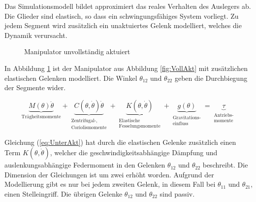 Das Simulationsmodell bildet approximiert das reales Verhalten des Auslegers ab. Die Glieder sind elastisch, so dass ein schwingungsfähiges System vorliegt. Zu jedem Segment wird zusätzlich ein unaktuiertes Gelenk modelliert, welches die Dynamik verursacht.

\begin{figure}[h]
	\centering
	
	\caption[]{Manipulator unvollständig aktuiert}
	\label{fig:UnterAkt}
\end{figure}   

In Abbildung \ref{fig:UnterAkt} ist der Manipulator aus Abbildung \ref{fig:VollAkt} mit zusätzlichen elastischen Gelenken modelliert. Die Winkel $\theta_{12}$ und $\theta_{22}$ geben die Durchbiegung der Segmente wider.

\begin{equation} \label{eq:UnterAkt}
\underbrace{M(\theta)\ddot{\theta}}_{\mbox{Trägheitsmomente}} + \underbrace{C(\theta,\dot{\theta})\dot{\theta}}_{\begin{matrix}
\mbox{Zentrifugal-,} \\ \mbox{Coriolismomente} \end{matrix}}+\underbrace{K(\theta,\dot{\theta})}_{\begin{matrix}
\mbox{Elastische} \\ \mbox{Fesselungsmomente} \end{matrix}}+\underbrace{g(\theta)}_{\begin{matrix}
\mbox{Gravitations-} \\ \mbox{einfluss} \end{matrix}}=\underbrace{\tau}_{\begin{matrix}
\mbox{Antriebs-} \\ \mbox{momente} \end{matrix}} 
\end{equation} 

Gleichung (\ref{eq:UnterAkt}) hat durch die elastischen Gelenke zusätzlich einen Term $K(\theta,\dot{\theta})$, welcher die geschwindigkeitsabhängige Dämpfung und auslenkungsabhängige Federmoment in den Gelenken $\theta_{12}$ und $\theta_{22}$ beschreibt. Die Dimension der Gleichungen ist um zwei erhöht worden. %
Aufgrund der Modellierung gibt es nur bei jedem zweiten Gelenk, in diesem Fall bei $\theta_{11}$ und $\theta_{21}$, einen Stelleingriff. Die übrigen Gelenke $\theta_{12}$ und $\theta_{22}$ sind passiv.


